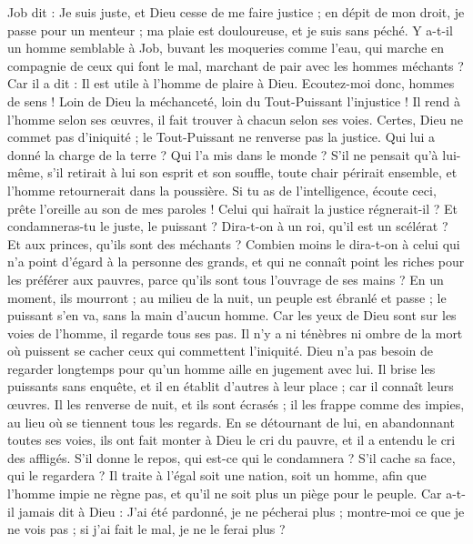 \begin{multicols}{2}
Job dit : Je suis juste, et Dieu cesse de me faire justice ;
en dépit de mon droit, je passe pour un menteur ; ma plaie est douloureuse, et je suis sans péché.
Y a-t-il un homme semblable à Job, buvant les moqueries comme l'eau,
qui marche en compagnie de ceux qui font le mal, marchant de pair avec les hommes méchants ?
Car il a dit : Il est utile à l'homme de plaire à Dieu.
Ecoutez-moi donc, hommes de sens ! Loin de Dieu la méchanceté, loin du Tout-Puissant l'injustice !
Il rend à l'homme selon ses œuvres, il fait trouver à chacun selon ses voies.
Certes, Dieu ne commet pas d'iniquité ; le Tout-Puissant ne renverse pas la justice.
Qui lui a donné la charge de la terre ? Qui l'a mis dans le monde ?
S'il ne pensait qu'à lui-même, s'il retirait à lui son esprit et son souffle,
toute chair périrait ensemble, et l'homme retournerait dans la poussière.
Si tu as de l'intelligence, écoute ceci, prête l'oreille au son de mes paroles !
Celui qui haïrait la justice régnerait-il ? Et condamneras-tu le juste, le puissant ?
Dira-t-on à un roi, qu'il est un scélérat ? Et aux princes, qu'ils sont des méchants ?
Combien moins le dira-t-on à celui qui n'a point d'égard à la personne des grands, et qui ne connaît point les riches pour les préférer aux pauvres, parce qu'ils sont tous l'ouvrage de ses mains ?
En un moment, ils mourront ; au milieu de la nuit, un peuple est ébranlé et passe ; le puissant s'en va, sans la main d'aucun homme.
Car les yeux de Dieu sont sur les voies de l'homme, il regarde tous ses pas.
Il n'y a ni ténèbres ni ombre de la mort où puissent se cacher ceux qui commettent l'iniquité.
Dieu n'a pas besoin de regarder longtemps pour qu'un homme aille en jugement avec lui.
Il brise les puissants sans enquête, et il en établit d'autres à leur place ;
car il connaît leurs œuvres. Il les renverse de nuit, et ils sont écrasés ;
il les frappe comme des impies, au lieu où se tiennent tous les regards.
En se détournant de lui, en abandonnant toutes ses voies,
ils ont fait monter à Dieu le cri du pauvre, et il a entendu le cri des affligés.
S'il donne le repos, qui est-ce qui le condamnera ? S'il cache sa face, qui le regardera ? Il traite à l'égal soit une nation, soit un homme,
afin que l'homme impie ne règne pas, et qu'il ne soit plus un piège pour le peuple.
Car a-t-il jamais dit à Dieu : J'ai été pardonné, je ne pécherai plus ;
montre-moi ce que je ne vois pas ; si j'ai fait le mal, je ne le ferai plus ?

\end{multicols}
